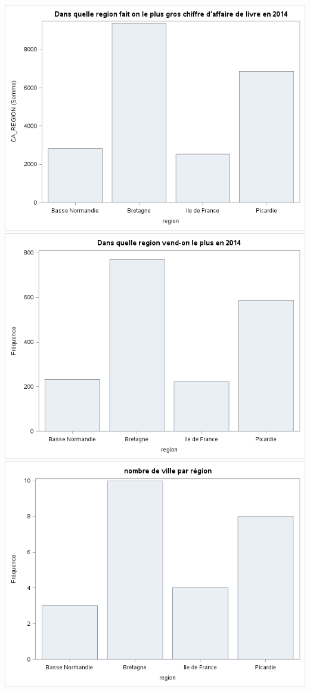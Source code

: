 \includegraphics[scale=0.7]{./images/sas_report/nb_ville_region.png}
\includegraphics[scale=0.7]{./images/sas_report/sas_report_1.png}
\includegraphics[scale=0.7]{./images/sas_report/sas_report_2.png}

